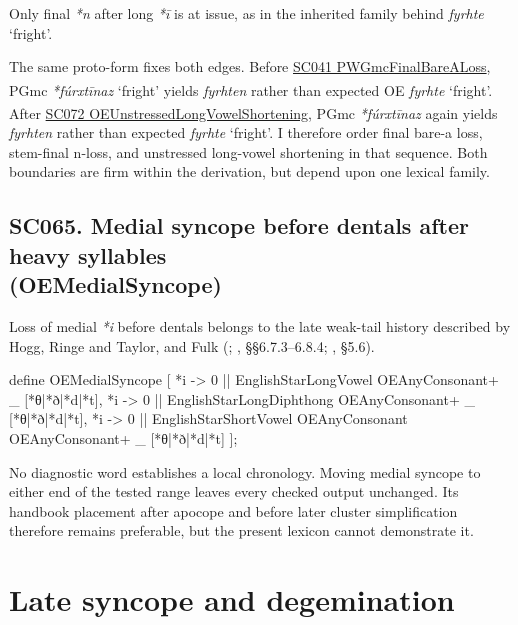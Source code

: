 \documentclass[
  british,
  a4paper,
  openany]{book}
\providecommand{\Pred}[1]{\textsuperscript{\dag}\emph{#1}}
\providecommand{\Recon}[1]{\emph{*#1}}
{\catcode`→=\active \global\def→{\ensuremath{\rightarrow}}}
\providecommand{\texorpdfstring}[2]{#1}
\DeclareRobustCommand{\CAPRRuleHeading}[2]{%
  #1\texorpdfstring{\\(#2)}{ (#2)}%
}
\providecommand{\Pred}[1]{\textsuperscript{\dag}\emph{#1}}
\providecommand{\Recon}[1]{\emph{*#1}}
{\catcode`→=\active \global\def→{\ensuremath{\rightarrow}}}
\begin{document}
Only final \emph{*n} after long \emph{*ī} is at issue, as in the
inherited family behind \emph{fyrhte} `fright'.

The same proto-form fixes both edges. Before
\hyperref[rule-PWGmcFinalBareALoss]{SC041 PWGmcFinalBareALoss}, PGmc
\Recon{fúrxtīnaz} `fright' yields \Pred{fyrhten} rather than expected OE
\emph{fyrhte} `fright'. After
\hyperref[rule-OEUnstressedLongVowelShortening]{SC072
OEUnstressedLongVowelShortening}, PGmc \Recon{fúrxtīnaz} again yields
\Pred{fyrhten} rather than expected \emph{fyrhte} `fright'. I therefore
order final bare-a loss, stem-final n-loss, and unstressed long-vowel
shortening in that sequence. Both boundaries are firm within the
derivation, but depend upon one lexical family.

\subsection{\texorpdfstring{\CAPRRuleHeading{SC065. Medial syncope before dentals after heavy syllables}{OEMedialSyncope}}{}}\label{rule-OEMedialSyncope}

Loss of medial \emph{*i} before dentals belongs to the late weak-tail
history described by Hogg, Ringe and Taylor, and Fulk
(;
,
§§6.7.3--6.8.4; , §5.6).

\begin{ReaderFacingFoma}
define OEMedialSyncope [
    {*i} -> 0 || EnglishStarLongVowel OEAnyConsonant+ _ [{*θ}|{*ð}|{*d}|{*t}],
    {*i} -> 0 || EnglishStarLongDiphthong OEAnyConsonant+ _ [{*θ}|{*ð}|{*d}|{*t}],
    {*i} -> 0 || EnglishStarShortVowel OEAnyConsonant OEAnyConsonant+ _ [{*θ}|{*ð}|{*d}|{*t}]
];
\end{ReaderFacingFoma}

No diagnostic word establishes a local chronology. Moving medial syncope
to either end of the tested range leaves every checked output unchanged.
Its handbook placement after apocope and before later cluster
simplification therefore remains preferable, but the present lexicon
cannot demonstrate it.

\newpage

\section{Late syncope and
degemination}\label{late-syncope-and-degemination}
\end{document}
